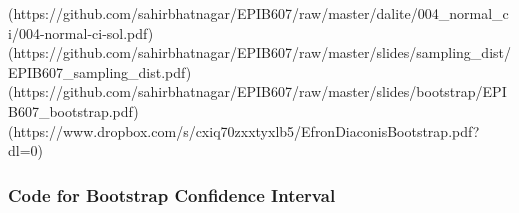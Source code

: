 \documentclass[]{book}
\let\originaltabular\tabular
\let\endoriginaltabular\endtabular
\renewenvironment{tabular}[1]{%
  \begingroup%
  \centering%
  \originaltabular{#1}}%
  {\endoriginaltabular\endgroup}
\theoremstyle{definition}
\theoremstyle{definition}
\theoremstyle{definition}
\theoremstyle{remark}
\begin{document}
\begin{table}[H]
\centering
\begin{tabular}{l}
(https://github.com/sahirbhatnagar/EPIB607/raw/master/dalite/004\_normal\_ci/004-normal-ci-sol.pdf)\\
(https://github.com/sahirbhatnagar/EPIB607/raw/master/slides/sampling\_dist/EPIB607\_sampling\_dist.pdf)\\
(https://github.com/sahirbhatnagar/EPIB607/raw/master/slides/bootstrap/EPIB607\_bootstrap.pdf)\\
(https://www.dropbox.com/s/cxiq70zxxtyxlb5/EfronDiaconisBootstrap.pdf?dl=0)\\
\hline
\end{tabular}
\end{table}

\subsubsection{Code for Bootstrap Confidence
Interval}\label{code-for-bootstrap-confidence-interval}
\end{document}
